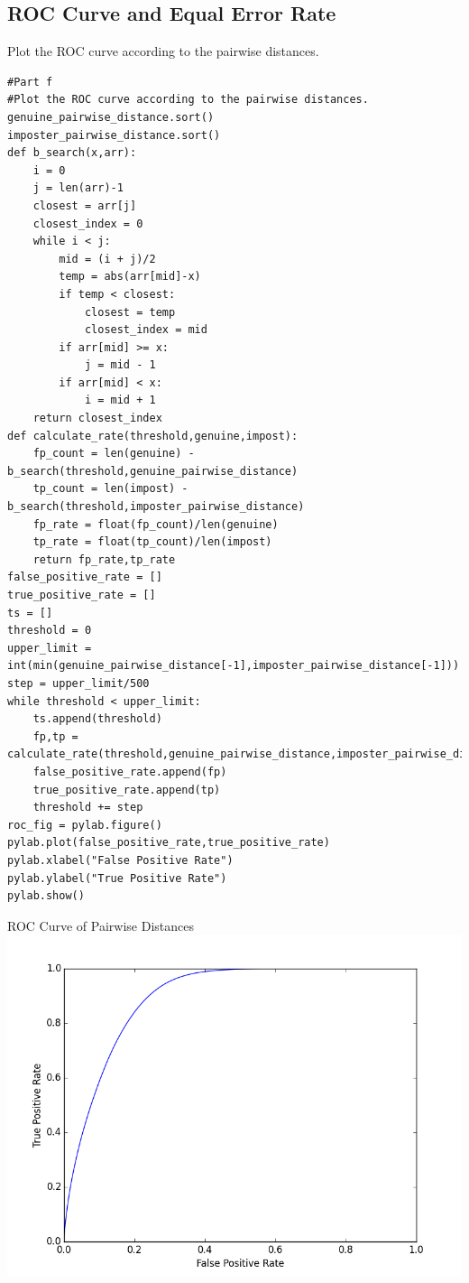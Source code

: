 \documentclass[a4paper]{article}
\begin{document}
\subsection*{ROC Curve and Equal Error Rate}
Plot the ROC curve according to the pairwise distances.
\begin{lstlisting}
#Part f
#Plot the ROC curve according to the pairwise distances.
genuine_pairwise_distance.sort()
imposter_pairwise_distance.sort()
def b_search(x,arr):
    i = 0
    j = len(arr)-1
    closest = arr[j]
    closest_index = 0
    while i < j:
        mid = (i + j)/2
        temp = abs(arr[mid]-x)
        if temp < closest:
            closest = temp
            closest_index = mid
        if arr[mid] >= x:
            j = mid - 1
        if arr[mid] < x:
            i = mid + 1
    return closest_index  
def calculate_rate(threshold,genuine,impost):
    fp_count = len(genuine) - b_search(threshold,genuine_pairwise_distance)
    tp_count = len(impost) - b_search(threshold,imposter_pairwise_distance)
    fp_rate = float(fp_count)/len(genuine)
    tp_rate = float(tp_count)/len(impost)
    return fp_rate,tp_rate
false_positive_rate = []
true_positive_rate = []
ts = []
threshold = 0
upper_limit = int(min(genuine_pairwise_distance[-1],imposter_pairwise_distance[-1]))
step = upper_limit/500
while threshold < upper_limit:
    ts.append(threshold)
    fp,tp = calculate_rate(threshold,genuine_pairwise_distance,imposter_pairwise_distance)
    false_positive_rate.append(fp)
    true_positive_rate.append(tp)
    threshold += step
roc_fig = pylab.figure()
pylab.plot(false_positive_rate,true_positive_rate)
pylab.xlabel("False Positive Rate")
pylab.ylabel("True Positive Rate")
pylab.show()
\end{lstlisting}
\begin{center}
ROC Curve of Pairwise Distances
\includegraphics[scale=0.63]{ROC_Curve.png}
\end{center}
\end{document}
